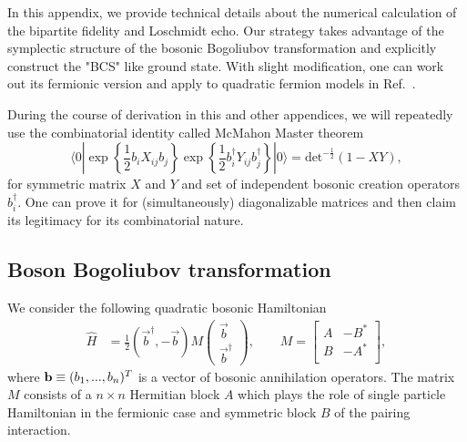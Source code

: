 
In this appendix, we provide technical details about the numerical calculation of the bipartite fidelity and Loschmidt echo.  Our strategy takes advantage of the symplectic structure of the bosonic Bogoliubov transformation and explicitly construct the "BCS" like ground state. With slight modification\cite{blaizot_quantum_1986}, one can work out its fermionic version and apply to quadratic fermion models in Ref.~.

During the course of derivation in this and other appendices, we will repeatedly use the combinatorial identity called McMahon Master theorem
\begin{equation}
\label{eq:bosonic_McMahon}
\langle0|\exp\left\{\frac{1}{2}b_iX_{ij}b_j\right\}\exp\left\{\frac{1}{2}b^\dagger_iY_{ij}b^\dagger_j\right\}|0\rangle=\text{det}^{-\frac{1}{2}}(1-XY),
\end{equation}
for symmetric matrix $X$ and $Y$ and set of independent bosonic creation operators $b_i^{\dagger}$. One can prove it for (simultaneously) diagonalizable matrices and then claim its legitimacy for its combinatorial nature. 

\subsection{Boson Bogoliubov transformation}
\label{app_sub:boson_BdG}
We consider the following quadratic bosonic Hamiltonian
\begin{equation}
\begin{aligned}
\label{eq:quadratic_boson_H}
\hat{H} &= \frac{1}{2} (\vec{b}^{\dagger}, -\vec{b}) M 
\begin{pmatrix}
\vec{b}\\
\vec{b}^{\dagger} 
\end{pmatrix},  \qquad 
M = 
\begin{bmatrix}
A & -B^* \\
B & -A^* \\
\end{bmatrix},
\end{aligned}
\end{equation}
where ${\bf b}\equiv(b_{1},...,b_{n})^T$ is a vector of bosonic annihilation operators. The matrix $M$ consists of a $n\times n$ Hermitian block $A$ which plays the role of single particle Hamiltonian in the fermionic case and symmetric block $B$ of the pairing interaction. 

